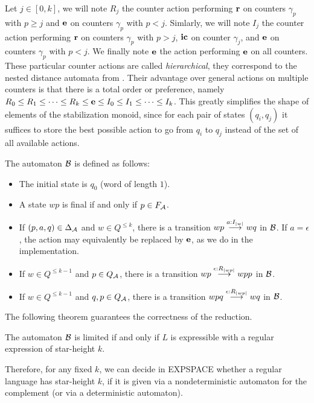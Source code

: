 Let $j\in[0,k]$, we will note $R_j$ the counter action performing $\mathbf{r}$ on counters $\gamma_p$ with $p\geq j$ and $\mathbf{e}$ on counters $\gamma_p$ with $p<j$. Simlarly, we will note $I_j$ the counter action performing $\mathbf{r}$ on counters $\gamma_p$ with $p> j$, $\mathbf{ic}$ on counter $\gamma_j$, and $\mathbf{e}$ on counters $\gamma_p$ with $p<j$. We finally note $\mathbf{e}$ the action performing $\mathbf{e}$ on all counters.
These particular counter actions are called \emph{hierarchical}, they correspond to the nested distance automata from \cite{Kirsten05}. Their advantage over general actions on multiple counters is that there is a total order or preference, namely $R_0 \leq R_1 \leq \dots \leq R_k \leq \mathbf{e} \leq I_0 \leq I_1 \leq \dots \leq I_k$. This greatly simplifies the shape of elements of the stabilization monoid, since for each pair of states $(q_i,q_j)$ it suffices to store the best possible action to go from $q_i$ to $q_j$ instead of the set of all available actions.

The automaton $\mathcal B$ is defined as follows:

\begin{itemize}
\item The initial state is $q_0$ (word of length $1$).
\item A state $wp$ is final if and only if $p\in F_{\mathcal{A}}$.
\item If $(p,a,q)\in\Delta_{\mathcal{A}}$ and $w\in Q^{\leq k}$, there is a transition $wp\stackrel{a:I_{|w|}}{\longrightarrow}wq$ in $\mathcal B$. If $a=\epsilon$, the action may equivalently be replaced by $\mathbf{e}$, as we do in the implementation.
\item If $w\in Q^{\leq k-1}$ and $p\in Q_{\mathcal{A}}$, there is a transition $wp\stackrel{\epsilon:R_{|wp|}}{\longrightarrow}wpp$ in $\mathcal B$.
\item If $w\in Q^{\leq k-1}$ and $q,p\in Q_{\mathcal{A}}$, there is a transition $wpq\stackrel{\epsilon:R_{|wp|}}{\longrightarrow}wq$ in $\mathcal B$.
\end{itemize}


The following theorem guarantees the correctness of the reduction.
\begin{theorem}\cite{CL08sh}
The automaton $\mathcal B$ is limited if and only if $L$ is expressible with a regular expression of star-height $k$.
\end{theorem}

Therefore, for any fixed $k$, we can decide in EXPSPACE whether a regular language has star-height $k$, if it is given via a nondeterministic automaton for the complement (or via a deterministic automaton).

